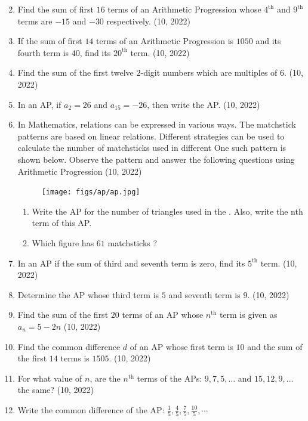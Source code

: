 \begin{enumerate}[label=\thesubsection.\arabic*,ref=\thesubsection.\theenumi,itemsep=1pt]
\begin{multicols}{4}
\end{multicols}
 \item Find the sum of first $16$ terms of an Arithmetic Progression whose $4^{\text{th}}$ and $9^{\text{th}}$ terms are $-15$ and $-30$ respectively.
        \hfill (10,  2022) \item If the sum of first $14$ terms of an Arithmetic Progression is $1050$ and its fourth term is $40$, find its $20^{\text{th}}$ term.
\hfill (10,  2022)
         \item Find the sum of the first twelve $2$-digit numbers which are 
multiples of $6$.
\hfill (10,  2022)
         \item In an AP, if $a_2=26$ and $a_{15} = -26$, then write the AP.
\hfill (10,  2022)
         \item In Mathematics, relations can be expressed in various ways. The 
matchstick patterns are based on linear relations. Different strategies 
can be used to calculate the number of matchsticks used in different 
One such pattern is shown below. Observe the pattern and answer the 
following questions using Arithmetic Progression 
    \hfill (10,  2022) 
\begin{figure}[H]
    \centering
	\texttt{[image: figs/ap/ap.jpg]}
	\caption{}
    \label{fig:ap}
\end{figure}
    \begin{enumerate}
	 \item Write the AP for the number of triangles used in the . Also, 
write the nth term of this AP.
 \item Which figure has $61$ matchsticks ? 
    \end{enumerate} 
 \item In an AP if the sum of third and seventh term is zero, find its $5^{\text{th}}$ term.
        \hfill (10,  2022)
  \item Determine the AP whose third term is $5$ and seventh term is $9$.
        \hfill (10,  2022) \item Find the sum of the first $20$ terms of an AP whose $n^{\text{th}}$ term is given as $a_n=5-2n$
%
        \hfill (10,  2022) \item Find the common difference $d$ of an AP whose first term is $10$ and the sum of the first $14$ terms is $1505$.
        \hfill (10,  2022) \item For what value of $n$, are the $n^{\text{th}}$ terms of the APs: $9,7,5,\dots$ and $15,12,9,\dots$ the same?
    \hfill (10,  2022)
	 \item Write the common difference of the AP: $\frac{1}{5}, \frac{4}{5}, \frac{7}{5}, \frac{10}{5}, \cdots$

\end{enumerate}
